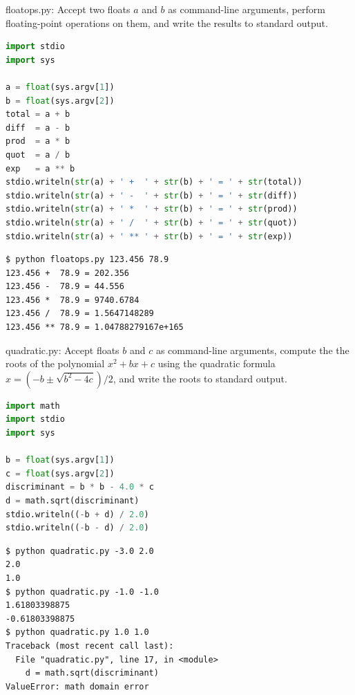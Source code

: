 \documentclass[8pt,a4paper,compress,handout]{beamer}
\begin{document}
\begin{frame}[fragile]
\begin{framed}
\tiny floatops.py: Accept two floats $a$ and $b$ as command-line arguments, perform floating-point operations on them, and write the results to standard output.
\end{framed}

\begin{lstlisting}[language=Python]
import stdio
import sys

a = float(sys.argv[1])
b = float(sys.argv[2])
total = a + b
diff  = a - b
prod  = a * b
quot  = a / b
exp   = a ** b
stdio.writeln(str(a) + ' +  ' + str(b) + ' = ' + str(total))
stdio.writeln(str(a) + ' -  ' + str(b) + ' = ' + str(diff))
stdio.writeln(str(a) + ' *  ' + str(b) + ' = ' + str(prod))
stdio.writeln(str(a) + ' /  ' + str(b) + ' = ' + str(quot))
stdio.writeln(str(a) + ' ** ' + str(b) + ' = ' + str(exp))
\end{lstlisting}

\begin{lstlisting}[language={}]
$ python floatops.py 123.456 78.9
123.456 +  78.9 = 202.356
123.456 -  78.9 = 44.556
123.456 *  78.9 = 9740.6784
123.456 /  78.9 = 1.5647148289
123.456 ** 78.9 = 1.04788279167e+165
\end{lstlisting}
\end{frame}

\begin{frame}[fragile]
\begin{framed}
\tiny quadratic.py: Accept floats $b$ and $c$ as command-line arguments, compute the the roots of the polynomial $x^2 + bx + c$ using the quadratic formula $x=(-b\pm \sqrt{b^2-4c})/2$, and write the roots to standard output.
\end{framed}

\begin{lstlisting}[language=Python]
import math
import stdio
import sys

b = float(sys.argv[1])
c = float(sys.argv[2])
discriminant = b * b - 4.0 * c
d = math.sqrt(discriminant)
stdio.writeln((-b + d) / 2.0)
stdio.writeln((-b - d) / 2.0)
\end{lstlisting}

\begin{lstlisting}[language={}]
$ python quadratic.py -3.0 2.0
2.0
1.0
$ python quadratic.py -1.0 -1.0
1.61803398875
-0.61803398875
$ python quadratic.py 1.0 1.0
Traceback (most recent call last):
  File "quadratic.py", line 17, in <module>
    d = math.sqrt(discriminant)
ValueError: math domain error
\end{lstlisting}
\end{frame}
\end{document}
